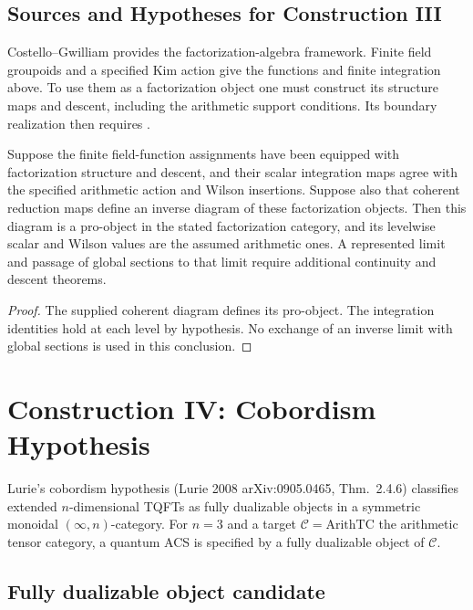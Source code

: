 \subsection{Sources and Hypotheses for Construction III}
\label{v4-arith:w10-a:ah:construction-III}

Costello--Gwilliam provides the factorization-algebra framework.
Finite field groupoids and a specified Kim action give the functions
and finite integration above. To use them as a factorization object
one must construct its structure maps and descent, including the
arithmetic support conditions. Its boundary realization then requires
.

\begin{theorem}
\label{v4-arith:w10-a:thm:construction-III-closure}
Suppose the finite field-function assignments have been equipped with
factorization structure and descent, and their scalar integration
maps agree with the specified arithmetic action and Wilson insertions.
Suppose also that coherent reduction maps define an inverse diagram
of these factorization objects. Then this diagram is a pro-object
in the stated factorization category, and its levelwise scalar and
Wilson values are the assumed arithmetic ones.
A represented limit and passage of global sections to that limit
require additional continuity and descent theorems.
\end{theorem}
\begin{proof}
The supplied coherent diagram defines its pro-object. The integration
identities hold at each level by hypothesis. No exchange of an
inverse limit with global sections is used in this conclusion.
\end{proof}

\section{Construction IV: Cobordism Hypothesis}
\label{v4-arith:w10-a:construction-IV}

Lurie's cobordism hypothesis (Lurie 2008 arXiv:0905.0465, Thm.~2.4.6)
classifies extended \(n\)-dimensional TQFTs as fully dualizable
objects in a symmetric monoidal \((\infty,n)\)-category. For
\(n=3\) and a target
\(\mathcal{C}=\mathrm{ArithTC}\) the arithmetic tensor category, a
quantum ACS is specified by a fully dualizable object of \(\mathcal{C}\).

\subsection{Fully dualizable object candidate}
\label{v4-arith:w10-a:cobord-candidate}

